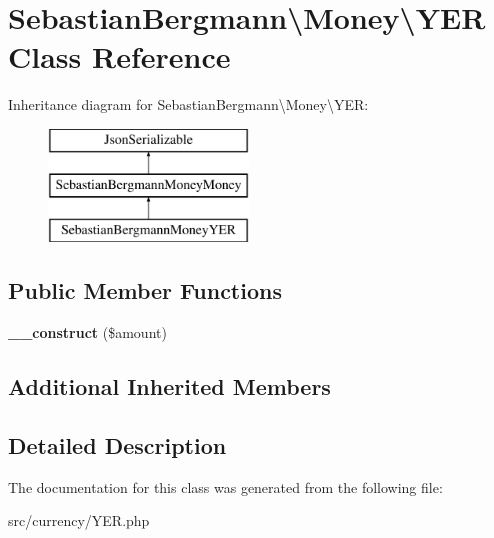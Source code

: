 \hypertarget{classSebastianBergmann_1_1Money_1_1YER}{}\section{Sebastian\+Bergmann\textbackslash{}Money\textbackslash{}Y\+E\+R Class Reference}
\label{classSebastianBergmann_1_1Money_1_1YER}
Inheritance diagram for Sebastian\+Bergmann\textbackslash{}Money\textbackslash{}Y\+E\+R\+:\begin{figure}[H]
\begin{center}
\leavevmode
\includegraphics[height=3.000000cm]{classSebastianBergmann_1_1Money_1_1YER}
\end{center}
\end{figure}
\subsection*{Public Member Functions}
\begin{DoxyCompactItemize}
\item 
\hypertarget{classSebastianBergmann_1_1Money_1_1YER_a9ada0a62f3bd6299fcaddc8bce6f769c}{}{\bfseries \+\_\+\+\_\+construct} (\$amount)\label{classSebastianBergmann_1_1Money_1_1YER_a9ada0a62f3bd6299fcaddc8bce6f769c}

\end{DoxyCompactItemize}
\subsection*{Additional Inherited Members}


\subsection{Detailed Description}


The documentation for this class was generated from the following file\+:\begin{DoxyCompactItemize}
\item 
src/currency/Y\+E\+R.\+php\end{DoxyCompactItemize}
